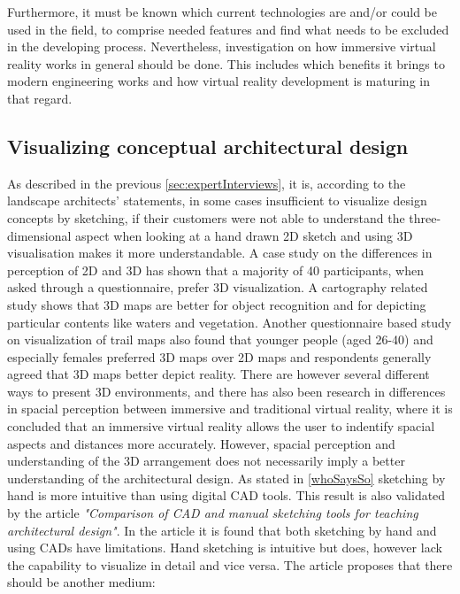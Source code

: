 		Furthermore, it must be known which current technologies are and/or could be used in the field, to comprise needed features and find what needs to be excluded in the developing process. Nevertheless, investigation on how immersive virtual reality works in general should be done. This includes which benefits it brings to modern engineering works and how virtual reality development is maturing in that regard.		
			
	
			\subsection{Visualizing conceptual architectural design}
			As described in the previous \autoref{sec:expertInterviews}, it is, according to the landscape architects' statements, in some cases insufficient to visualize design concepts by sketching, if their customers were not able to understand the three-dimensional aspect when looking at a hand drawn 2D sketch and using 3D visualisation makes it more understandable. A case study on the differences in perception of 2D and 3D\cite{2Dvs3D} has shown that a majority of 40 participants, when asked through a  questionnaire, prefer 3D visualization. A cartography related study shows that 3D maps are better for object recognition and for depicting particular contents like waters and vegetation\cite{2Dvs3DobjectRecognition}. Another questionnaire based study on visualization of trail maps also found that younger people (aged 26-40) and especially females preferred 3D maps over 2D maps\cite{2Dvs3DtrailMaps} and respondents generally agreed that 3D maps better depict reality. There are however several different ways to present 3D environments, and there has also been research in differences in spacial perception between immersive and traditional virtual reality\cite{immersive3DModel}, where it is concluded that an immersive virtual reality allows the user to indentify spacial aspects and distances more accurately. However, spacial perception and understanding of the 3D arrangement does not necessarily imply a better understanding of the architectural design. As stated in \autoref{whoSaysSo} sketching by hand is more intuitive than using digital CAD tools. This result is also validated by the article \textit{"Comparison of CAD and manual sketching tools for teaching architectural design"}\cite{sketchingVsCAD}. In the article it is found that both sketching by hand and using CADs have limitations. Hand sketching is intuitive but does, however lack the capability to visualize in detail and vice versa. The article proposes that there should be another medium:\\
			
